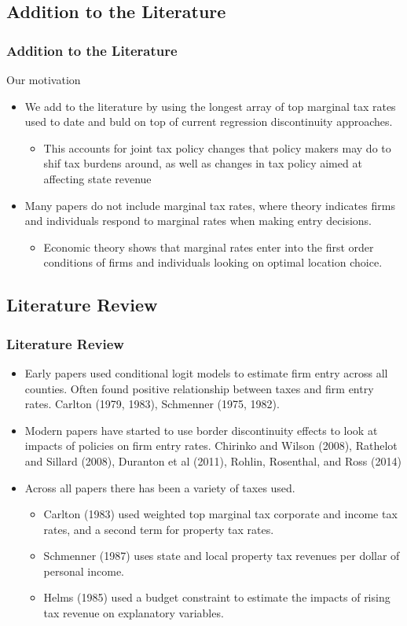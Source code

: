 \documentclass{beamer}
\begin{document}
\begin{frame}
\section{Addition to the Literature}
\frametitle{Addition to the Literature}
Our motivation
\begin{itemize}
\item We add to the literature by using the longest array of top marginal tax rates used to date and buld on top of current regression discontinuity approaches.
\begin{itemize}
\item This accounts for joint tax policy changes that policy makers may do to shif tax burdens around, as well as changes in tax policy aimed at affecting state revenue
\end{itemize}
\item  Many papers do not include marginal tax rates, where theory indicates firms and individuals respond to marginal rates when making entry decisions.
\begin{itemize}
\item Economic theory shows that marginal rates enter into the first order conditions of firms and individuals looking on optimal location choice.
\end{itemize}
\end{itemize}
\end{frame}

\begin{frame}
\section{Literature Review}
\frametitle{Literature Review}
\begin{itemize}
\item Early papers used conditional logit models to estimate firm entry across all counties. Often found positive relationship between taxes and firm entry rates. Carlton (1979, 1983), Schmenner (1975, 1982).
\item Modern papers have started to use border discontinuity effects to look at impacts of policies on firm entry rates. Chirinko and Wilson (2008), Rathelot and Sillard (2008), Duranton et al (2011), Rohlin, Rosenthal, and Ross (2014)
\item Across all papers there has been a variety of taxes used. 
\begin{itemize}
\item  Carlton (1983) used weighted top marginal tax corporate and income tax rates, and a second term for property tax rates. 
\item Schmenner (1987) uses state and local property tax revenues per dollar of personal income. 
\item Helms (1985) used a budget constraint to estimate the impacts of rising tax revenue on explanatory variables.
\end{itemize}
\end{itemize}
\end{frame}
\end{document}

